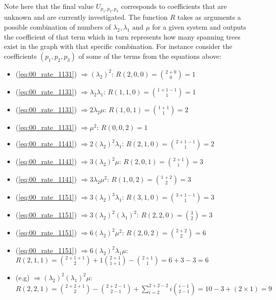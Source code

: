 Note here that the final value \(U_{p_1,p_2,p_3}\) corresponds to coefficients 
that are unknown and are currently investigated. 
The function \(R\) takes as arguments a possible combination of numbers of 
\(\lambda_2, \lambda_1 \text{ and } \mu \) for a given system and outputs the 
coefficient of that term which in turn represents how many spanning trees exist 
in the graph with that specific combination. 
For instance consider the coefficients \((p_1,p_2,p_3)\) of some of the terms 
from the equations above:

\begin{multicols}{2}
    \begin{itemize}
        \item (\ref{eq:00_rate_1131}) \( \Rightarrow (\lambda_2)^2\): 
        \(R(2,0,0) = \binom{2+0}{0} = 1\)
        \item (\ref{eq:00_rate_1131}) \( \Rightarrow \lambda_2 \lambda_1\): 
        \(R(1,1,0) = \binom{1+1-1}{1} = 1\)
        \item (\ref{eq:00_rate_1131}) \( \Rightarrow 2 \lambda_2 \mu\): 
        \(R(1,0,1) = \binom{1+1}{1} = 2\)
        \item (\ref{eq:00_rate_1131}) \( \Rightarrow \mu^2\): \(R(0,0,2) = 1\)
        \item (\ref{eq:00_rate_1141}) \( \Rightarrow 2(\lambda_2)^2 \lambda_1\): 
        \(R(2,1,0) = \binom{2+1-1}{1} = 2\)
        \item (\ref{eq:00_rate_1141}) \( \Rightarrow 3(\lambda_2)^2 \mu\): 
        \(R(2,0,1) = \binom{2+1}{1} = 3\)
        \item (\ref{eq:00_rate_1141}) \( \Rightarrow 3 \lambda_2 \mu^2\): 
        \(R(1,0,2) = \binom{1+2}{2} = 3\)
        \item (\ref{eq:00_rate_1151}) \( \Rightarrow 3 (\lambda_2)^3 \lambda_1\): 
        \(R(3,1,0) = \binom{3+1-1}{1} = 3\)
        \item (\ref{eq:00_rate_1151}) \( \Rightarrow 3 (\lambda_2)^2 (\lambda_1)^2 \): 
        \(R(2,2,0) = \binom{3}{2} = 3\)
        \item (\ref{eq:00_rate_1151}) \( \Rightarrow 6 (\lambda_2)^2 \mu ^ 2\): 
        \(R(2,0,2) = \binom{2+2}{2} = 6\)
    \end{itemize}
\end{multicols}

\begin{itemize}
    \item (\ref{eq:00_rate_1151}) \( \Rightarrow 6 (\lambda_2)^2 \lambda_1 \mu\): 
    \(R(2,1,1) = \binom{2+1+1}{2} + 1\binom{2+1}{1+1} - \binom{2+1}{1} = 6 + 3 - 3 = 6\)
    \item \small{(e.g)} \( \Rightarrow (\lambda_2)^2 (\lambda_1)^2 \mu\): 
    \(R(2,2,1) = \binom{2+2+1}{2} - \binom{2+2-1}{2-1} + \sum_{i=2}^{2+2-2} 
    i\binom{i-1}{2-1} = 10 - 3 + (2 \times 1) = 9\)
\end{itemize}



